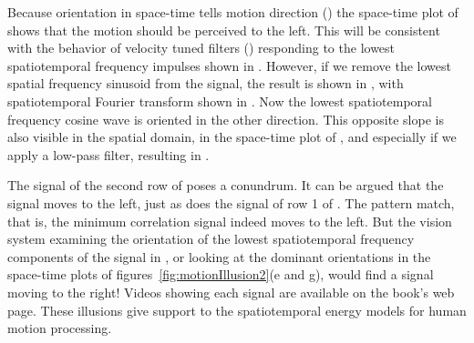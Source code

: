 Because orientation in space-time tells motion direction (\sect{\ref{sect:modelingSequences}}) the space-time plot of  shows that the motion should be perceived to the left.  This will be consistent with the behavior of velocity tuned filters (\sect{\ref{sect:velocityTunedFilters}}) responding to the lowest spatiotemporal frequency impulses shown in 
. However, if we remove the lowest spatial frequency sinusoid from the signal, the result is shown in 
, with spatiotemporal Fourier transform shown in .  Now the lowest spatiotemporal frequency cosine wave is oriented in the other direction.  This opposite slope is also visible in the spatial domain, in the space-time plot of , and especially if we apply a low-pass filter, resulting in .

The signal of the second row of \fig{\ref{fig:motionIllusion2}} poses a conundrum.  It can be argued that the signal moves to the left, just as does the signal of row 1 of \fig{\ref{fig:motionIllusion2}}.  The pattern match, that is, the minimum correlation signal indeed moves to the left.  But the vision system examining the orientation of the lowest spatiotemporal frequency components of the signal in , or looking at the dominant orientations in the space-time plots of figures~\ref{fig:motionIllusion2}(e and g), would find a signal moving to the right!  Videos showing each signal are available on the book's web page.  These illusions give support to the spatiotemporal energy models for human motion processing.
 





